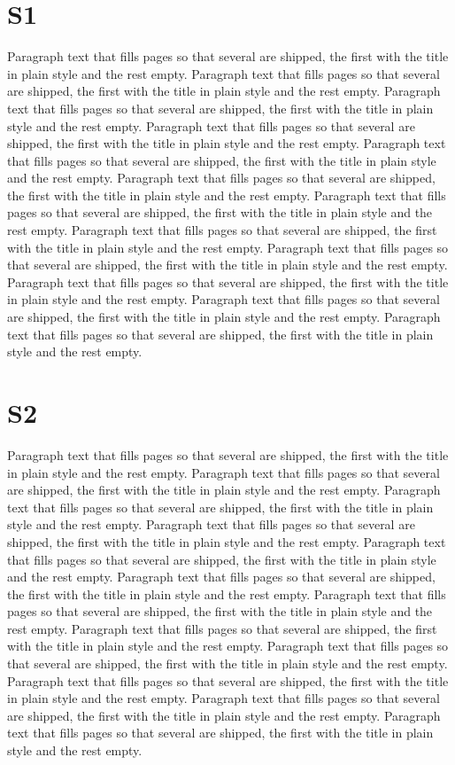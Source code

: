\documentclass{article}
\begin{document}
\section{S1}
Paragraph text that fills pages so that several are shipped, the first with the title in plain style and the rest empty. Paragraph text that fills pages so that several are shipped, the first with the title in plain style and the rest empty. Paragraph text that fills pages so that several are shipped, the first with the title in plain style and the rest empty. Paragraph text that fills pages so that several are shipped, the first with the title in plain style and the rest empty. Paragraph text that fills pages so that several are shipped, the first with the title in plain style and the rest empty. Paragraph text that fills pages so that several are shipped, the first with the title in plain style and the rest empty. Paragraph text that fills pages so that several are shipped, the first with the title in plain style and the rest empty. Paragraph text that fills pages so that several are shipped, the first with the title in plain style and the rest empty. Paragraph text that fills pages so that several are shipped, the first with the title in plain style and the rest empty. Paragraph text that fills pages so that several are shipped, the first with the title in plain style and the rest empty. Paragraph text that fills pages so that several are shipped, the first with the title in plain style and the rest empty. Paragraph text that fills pages so that several are shipped, the first with the title in plain style and the rest empty. 

\section{S2}
Paragraph text that fills pages so that several are shipped, the first with the title in plain style and the rest empty. Paragraph text that fills pages so that several are shipped, the first with the title in plain style and the rest empty. Paragraph text that fills pages so that several are shipped, the first with the title in plain style and the rest empty. Paragraph text that fills pages so that several are shipped, the first with the title in plain style and the rest empty. Paragraph text that fills pages so that several are shipped, the first with the title in plain style and the rest empty. Paragraph text that fills pages so that several are shipped, the first with the title in plain style and the rest empty. Paragraph text that fills pages so that several are shipped, the first with the title in plain style and the rest empty. Paragraph text that fills pages so that several are shipped, the first with the title in plain style and the rest empty. Paragraph text that fills pages so that several are shipped, the first with the title in plain style and the rest empty. Paragraph text that fills pages so that several are shipped, the first with the title in plain style and the rest empty. Paragraph text that fills pages so that several are shipped, the first with the title in plain style and the rest empty. Paragraph text that fills pages so that several are shipped, the first with the title in plain style and the rest empty. 
\end{document}
